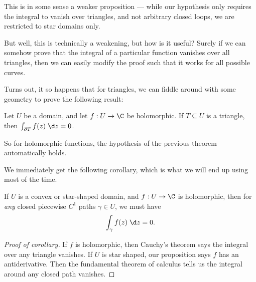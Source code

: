 \documentclass[a4paper]{article}
\begin{document}
This is in some sense a weaker proposition --- while our hypothesis only requires the integral to vanish over triangles, and not arbitrary closed loops, we are restricted to star domains only.

But well, this is technically a weakening, but how is it useful? Surely if we can somehow prove that the integral of a particular function vanishes over all triangles, then we can easily modify the proof such that it works for all possible curves.

Turns out, it so happens that for triangles, we can fiddle around with some geometry to prove the following result:

\begin{thm}
  Let $U$ be a domain, and let $f: U \to \C$ be holomorphic. If $T \subseteq U$ is a triangle, then $\int_{\partial T} f(z)\;\d z = 0$.
\end{thm}
So for holomorphic functions, the hypothesis of the previous theorem automatically holds.

We immediately get the following corollary, which is what we will end up using most of the time.
\begin{cor}
  If $U$ is a convex or star-shaped domain, and $f: U \to \C$ is holomorphic, then for \emph{any} closed piecewise $C^1$ paths $\gamma \in U$, we must have
  \[
    \int_\gamma f(z)\;\d z = 0.
  \]
\end{cor}

\begin{proof}[Proof of corollary]
  If $f$ is holomorphic, then Cauchy's theorem says the integral over any triangle vanishes. If $U$ is star shaped, our proposition says $f$ has an antiderivative. Then the fundamental theorem of calculus tells us the integral around any closed path vanishes.
\end{proof}
\end{document}
